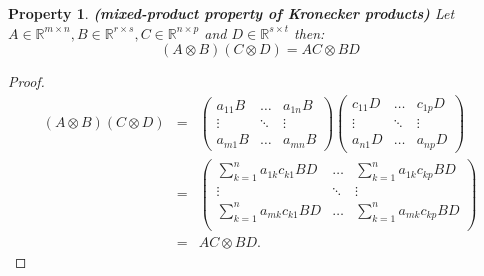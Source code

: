 \documentclass[a4paper,11pt]{report}
\newtheorem{property}[theorem]{Property}
\newcommand{\R}{{\mathbb R}}
\begin{document}
\begin{property}\textbf{(mixed-product property of Kronecker products)}
  Let $A \in \R^{m\times n}, B \in \R^{r \times s}, C \in \R^{n\times p}$ and $D \in \R^{s \times t}$ 
  then:
  $$(A\otimes B)(C \otimes D) = AC \otimes BD$$
\end{property}
\begin{proof}
  \begin{eqnarray*}
(A\otimes B)(C \otimes D) &=&
  \begin{pmatrix}
    a_{11}B & \ldots & a_{1n}B\\
    \vdots & \ddots & \vdots\\
    a_{m1}B & \ldots & a_{mn}B
  \end{pmatrix}
  \begin{pmatrix}
    c_{11}D & \ldots & c_{1p}D\\
    \vdots & \ddots & \vdots\\
    a_{n1}D & \ldots & a_{np}D
  \end{pmatrix}\\
  &=& \begin{pmatrix}
    \sum_{k=1}^n a_{1k}c_{k1}BD & \ldots & \sum_{k=1}^n a_{1k}c_{kp}BD\\
    \vdots & \ddots & \vdots\\
    \sum_{k=1}^n a_{mk}c_{k1}BD & \ldots & \sum_{k=1}^n a_{mk}c_{kp}BD\\
  \end{pmatrix}\\
  &=& AC \otimes BD.
  \end{eqnarray*}
\end{proof}
\end{document}

